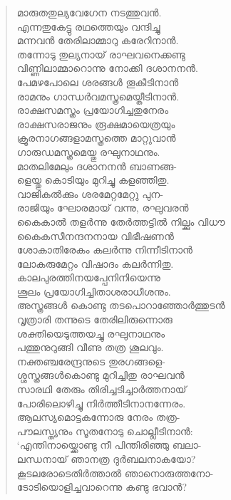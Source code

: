 \begin{verse}
മാരുതതുല്യവേഗേന നടത്തുവന്‍.\\
എന്നതുകേട്ടു രഥത്തെയും വന്ദിച്ചു\\
മന്നവന്‍ തേരിലാമ്മാറു കരേറിനാന്‍.\\
തന്നോടു തുല്യനായ് രാഘവനെക്കണ്ടു\\
വിണ്ണിലാമ്മാറൊന്നു നോക്കി ദശാനനന്‍.\\
പേമഴപോലെ ശരങ്ങള്‍ തൂകീടിനാന്‍\\
രാമനും ഗാന്ധര്‍വമസ്ത്രമെയ്തീടിനാന്‍.\\
രാക്ഷസമസ്ത്രം പ്രയോഗിച്ചതുനേരം\\
രാക്ഷസരാജനും രൂക്ഷമായെത്രയും\\
ക്രൂരനാഗങ്ങളാമസ്ത്രത്തെ മാറ്റുവാന്‍\\
ഗാരുഡമസ്ത്രമെയ്തു രഘുനാഥനും.\\
മാതലിമേലും ദശാനനന്‍ ബാണങ്ങ-\\
ളെയ്തു കൊടിയും മുറിച്ചു കളഞ്ഞിതു.\\
വാജികല്‍ക്കും ശരമേറ്റമേറ്റു പുന-\\
രാജിയും ഘോരമായ് വന്നു, രഘുവരന്‍\\
കൈകാല്‍ തളര്‍ന്നു തേര്‍ത്തട്ടില്‍ നില്ക്കും വിധൗ\\
കൈകസീനന്ദനനായ വിഭീഷണന്‍\\
ശോകാതിരേകം കലര്‍ന്നു നിന്നീടിനാന്‍\\
ലോകരുമേറ്റം വിഷാദം കലര്‍ന്നിതു.\\
കാലപുരത്തിനയപ്പേനിനിയെന്നു\\
ശൂലം പ്രയോഗിച്ചിതാശരാധീശനും.\\
അസ്ത്രങ്ങള്‍ കൊണ്ടു തടപൊറാഞ്ഞോര്‍ത്തുടന്‍\\
വൃത്രാരി തന്നുടെ തേരിലിരുന്നൊരു\\
ശക്തിയെടുത്തയച്ചു രഘുനാഥനും\\
പത്തുനുറുങ്ങി വീണു തത്ര ശൂലവും.\\
നക്തഞ്ചരേന്ദ്രനുടെ തുരഗങ്ങളെ-\\
ശ്ശസ്ത്രങ്ങള്‍കൊണ്ടു മുറിച്ചിതു രാഘവന്‍\\
സാരഥി തേരും തിരിച്ചടിച്ചാര്‍ത്തനായ്\\
പോരിലൊഴിച്ചു നിര്‍ത്തീടിനാനന്നേരം.\\
ആലസ്യമൊട്ടകന്നോരു നേരം തത്ര-\\
പൗലസ്ത്യനും സൂതനോടു ചൊല്ലീടിനാന്‍:\\
‘എന്തിനായ്ക്കൊണ്ടു നീ പിന്തിരിഞ്ഞു ബലാ-\\
ലന്ധനായ് ഞാനത്ര ദുര്‍ബലനാകയോ?\\
കൂടലരോടെതിര്‍ത്താല്‍ ഞാനൊരുത്തനോ-\\
ടോടിയൊളിച്ചവാറെന്നു കണ്ടു ഭവാന്‍?\\

\end{verse}
